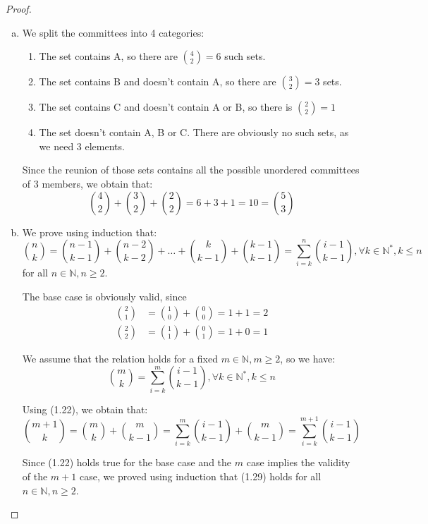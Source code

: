 \begin{proof}
    \hfill
    \begin{enumerate}[(a)]
        \item We split the committees into 4 categories:
            \begin{enumerate}[(1)]
                \item The set contains A, so there are $\binom{4}{2} = 6$ such sets.
                \item The set contains B and doesn't contain A, so there are $\binom{3}{2} = 3$ sets.
                \item The set contains C and doesn't contain A or B, so there is $\binom{2}{2} = 1$
                \item The set doesn't contain A, B or C. There are obviously no such sets, as we
                    need 3 elements.
           \end{enumerate}

        Since the reunion of those sets contains all the possible unordered committees of 3 members,
        we obtain that:
        \[
            \binom{4}{2} + \binom{3}{2} + \binom{2}{2} = 6 + 3 + 1 = 10 = \binom{5}{3}
        \] 
        
        \item We prove using induction that:
        \begin{equation*}\tag{1.29}
            \binom{n}{k} = \binom{n - 1}{k - 1} + \binom{n - 2}{k - 2} + \ldots + 
                            \binom{k}{k - 1} + \binom{k - 1}{k - 1}
                            = \sum_{i = k}^{n} \binom{i - 1}{k - 1}, \forall k \in \mathbb{N^*}, k \leq n
        \end{equation*}
        for all $n \in \mathbb{N}, n \geq 2$.

        The base case is obviously valid, since
        \begin{align*}
            \binom{2}{1} &= \binom{1}{0} + \binom{0}{0} = 1 + 1 = 2 \\
            \binom{2}{2} &= \binom{1}{1} + \binom{0}{1} = 1 + 0 = 1
        \end{align*}

        We assume that the relation holds for a fixed $m \in \mathbb{N}, m \geq 2$, so we have:
        \[
            \binom{m}{k} = \sum_{i = k}^{m}\binom{i - 1}{k - 1}, \forall k \in \mathbb{N^*}, k \leq n
        \]

        Using (1.22), we obtain that: 
        \[
            \binom{m + 1}{k} = \binom{m}{k} + \binom{m}{k - 1} 
                             = \sum_{i = k}^{m}\binom{i - 1}{k - 1} + \binom{m}{k - 1} 
                             = \sum_{i = k}^{m + 1}\binom{i - 1}{k - 1} 
        \] 

        Since (1.22) holds true for the base case and the $m$ case implies the validity of the $m + 1$ case,
        we proved using induction that (1.29) holds for all $n \in \mathbb{N}, n \geq 2$.
    \end{enumerate}
\end{proof}
